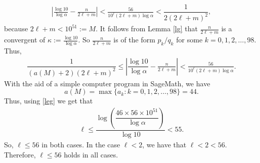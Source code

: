 \documentclass[10pt,a4paper]{article}
\begin{document}
\begin{align*}
\left|\frac{\log 10}{\log \alpha} - \frac{n}{2\ell+m}  \right| < \frac{56}{10^\ell(2\ell+m) \log \alpha}<\dfrac{1}{2(2\ell+m)^2},
\end{align*}
because $ 2\ell+m<10^{51}:=M $. It follows from Lemma \ref{lg} that $ \frac{n}{2\ell+m} $  is a convergent of $ \kappa:=\frac{\log 10}{\log\alpha} $. So $ \frac{n}{2\ell+m} $ is of the form $ p_k/q_k $ for some $ k=0, 1, 2, \ldots, 98 $. Thus,
\begin{align}\label{leg}
\dfrac{1}{(a(M)+2)(2\ell+m)^2}\le \left|\dfrac{\log 10}{\log \alpha}-\frac{n}{2\ell+m} \right|<\frac{56}{10^\ell(2\ell+m) \log \alpha}.
\end{align}
With the aid of a simple computer program in SageMath, we have $$ a(M)=\max\{a_{k}: k=0, 1, 2, \ldots, 98\}=44. $$ Thus, using \eqref{leg} we get that
\begin{align*}
\ell \leq \dfrac{\log\left(\dfrac{46\times 56 \times 10^{51}}{\log\alpha}\right)}{\log 10} < 55.
\end{align*}
So, $ \ell\le 56 $ in both cases. In the case $ \ell<2 $, we have that $ \ell<2<56 $. Therefore, $ \ell\le 56 $ holds in all cases.
\end{document}
